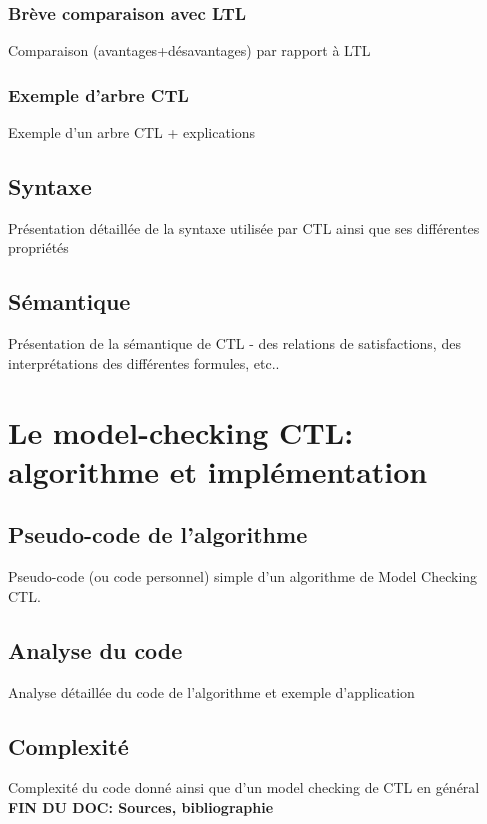 \documentclass[runningheads,a4paper,10pt]{llncs}
\begin{document}
\subsubsection{Brève comparaison avec LTL}
Comparaison (avantages+désavantages) par rapport à LTL 

\subsubsection{Exemple d'arbre CTL}
Exemple d'un arbre CTL + explications

\subsection{Syntaxe}
Présentation détaillée de la syntaxe utilisée par CTL ainsi que ses différentes propriétés 

\subsection{Sémantique}
Présentation de la sémantique de CTL - des relations de satisfactions, des interprétations des différentes formules, etc.. 

\section{Le model-checking CTL: algorithme et implémentation}
\subsection{Pseudo-code de l'algorithme}
Pseudo-code (ou code personnel) simple d'un algorithme de Model Checking CTL. 

\subsection{Analyse du code}
Analyse détaillée du code de l'algorithme et exemple d'application 

\subsection{Complexité}
Complexité du code donné ainsi que d'un model checking de CTL en général \\ 

\textbf{FIN DU DOC: Sources, bibliographie} 


\nocite{*} 
\end{document}
